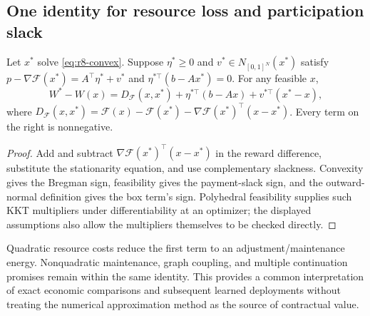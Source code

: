 \subsection{One identity for resource loss and participation slack}
\begin{theorem}\label{thm:r8-bregman}
Let $x^*$ solve \eqref{eq:r8-convex}. Suppose $\eta^*\geq0$ and $v^*\in N_{[0,1]^N}(x^*)$ satisfy
$p-\nabla\mathcal F(x^*)=A^\top\eta^*+v^*$ and
$\eta^{*\top}(b-Ax^*)=0$. For any feasible $x$,
\begin{equation}\label{eq:r8-bregman}
 W^*-W(x)=D_{\mathcal F}(x,x^*)+
 \eta^{*\top}(b-Ax)+v^{*\top}(x^*-x),
\end{equation}
where $D_{\mathcal F}(x,x^*)=\mathcal F(x)-\mathcal F(x^*)-
\nabla\mathcal F(x^*)^\top(x-x^*)$. Every term on the right is nonnegative.
\end{theorem}
\begin{proof}
Add and subtract $\nabla\mathcal F(x^*)^\top(x-x^*)$ in the reward difference, substitute the stationarity equation, and use complementary slackness. Convexity gives the Bregman sign, feasibility gives the payment-slack sign, and the outward-normal definition gives the box term's sign. Polyhedral feasibility supplies such KKT multipliers under differentiability at an optimizer; the displayed assumptions also allow the multipliers themselves to be checked directly.
\end{proof}
Quadratic resource costs reduce the first term to an adjustment/maintenance energy. Nonquadratic maintenance, graph coupling, and multiple continuation promises remain within the same identity. This provides a common interpretation of exact economic comparisons and subsequent learned deployments without treating the numerical approximation method as the source of contractual value.
